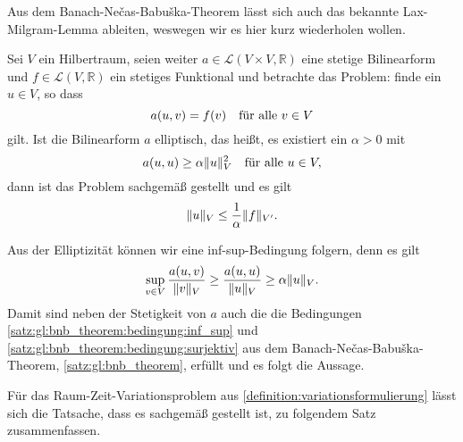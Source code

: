 Aus dem Banach-Ne{\v c}as-Babu{\v s}ka-Theorem lässt sich auch das bekannte Lax-Milgram-Lemma ableiten, weswegen wir es hier kurz wiederholen wollen.

\begin{Lemma}
\label{lemma:gl:lax_milgram}
    Sei $V$ ein Hilbertraum, seien weiter $a \in \mathcal L(V \times V, \mathbb{R})$ eine stetige Bilinearform und $f \in \mathcal L (V, \mathbb{R})$ ein stetiges Funktional und betrachte das Problem:
    finde ein $u \in V$, so dass
    \begin{equation}
        a(u, v) = f(v) \quad \fa v \in V
    \end{equation}
    gilt.
    Ist die Bilinearform $a$ elliptisch, das heißt, es existiert ein $\alpha > 0$ mit
    \begin{equation}
    \label{eq:lemma:lax_milgram:elliptisch}
        a(u, u) \geq \alpha \norm{u}_{V}^{2} \quad \fa u \in V,
    \end{equation}
    dann ist das Problem sachgemäß gestellt und es gilt
    \begin{equation}
        \norm{u}_{V} \leq \frac{1}{\alpha} \norm{f}_{V'}.
    \end{equation}

    \begin{Beweis}
        Aus der Elliptizität können wir eine inf-sup-Bedingung folgern, denn es gilt
        \begin{equation}
            \sup_{v \in V} \frac{a(u, v)}{\norm{v}_{V}} \geq \frac{a(u, u)}{\norm{u}_{V}} \geq \alpha \norm{u}_{V}.
        \end{equation}
        Damit sind neben der Stetigkeit von $a$ auch die die Bedingungen \ref{satz:gl:bnb_theorem:bedingung:inf_sup} und \ref{satz:gl:bnb_theorem:bedingung:surjektiv} aus dem Banach-Ne{\v c}as-Babu{\v s}ka-Theorem, \cref{satz:gl:bnb_theorem}, erfüllt und es folgt die Aussage.
    \end{Beweis}
\end{Lemma}

Für das Raum-Zeit-Variationsproblem aus \cref{definition:variationsformulierung} lässt sich die Tatsache, dass es sachgemäß gestellt ist, zu folgendem Satz zusammenfassen.

